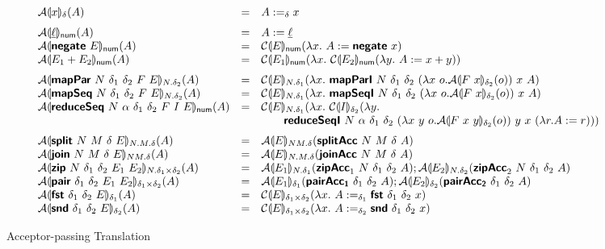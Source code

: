 \begin{figure}[H]
  \begin{displaymath}
    \begin{array}{lcl}
      \semA{x}_\delta(A)
      &=& A :=_\delta x
      \medskip\\

      \semA{\underline{\ell}}_{\num}(A)
      &=& A := \underline{\ell}
      \\
      \semA{\prim{negate}~E}_{\num}(A)
      &=& \semE{E}_{\num}(\lambda x.~A := \prim{negate}~x)
      \\
      \semA{E_1 + E_2}_{\num}(A)
      &=& \semE{E_1}_{\num}(\lambda x.~\semE{E_2}_{\num}(\lambda y.~A := x + y))
      \medskip\\

      \semA{\prim{mapPar}~N~\delta_1~\delta_2~F~E}_{N.\delta_2}(A)
      &=& \semE{E}_{N.\delta_1}(\lambda x.~\prim{mapParI}~N~\delta_1~\delta_2~(\lambda x~o. \semA{F~x}_{\delta_2}(o))~x~A)
      \\
      \semA{\prim{mapSeq}~N~\delta_1~\delta_2~F~E}_{N.\delta_2}(A)
      &=& \semE{E}_{N.\delta_1}(\lambda x.~\prim{mapSeqI}~N~\delta_1~\delta_2~(\lambda x~o. \semA{F~x}_{\delta_2}(o))~x~A)
      \\
      \semA{\prim{reduceSeq}~N~\alpha~\delta_1~\delta_2~F~I~E}_{\mathsf{num}}(A)
      &=& \begin{array}[t]{@{}l}
            \semE{E}_{N.\delta_1}(\lambda x.~\semE{I}_{\delta_2}(\lambda y.\\
            \quad\quad \prim{reduceSeqI}~N~\alpha~\delta_1~\delta_2~(\lambda x~y~o. \semA{F~x~y}_{\delta_2}(o))~y~x~(\lambda r.A := r)))
          \end{array}
      \medskip\\

      \semA{\prim{split}~N~M~\delta~E}_{N.M.\delta}(A)
      &=& \semA{E}_{NM.\delta}(\prim{splitAcc}~N~M~\delta~A)
      \\
      \semA{\prim{join}~N~M~\delta~E}_{NM.\delta}(A)
      &=& \semA{E}_{N.M.\delta}(\prim{joinAcc}~N~M~\delta~A)
      \\
      \semA{\prim{zip}~N~\delta_1~\delta_2~E_1~E_2}_{N.\delta_1\times\delta_2}(A)
      &=& \semA{E_1}_{N.\delta_1}(\prim{zipAcc}_1~N~\delta_1~\delta_2~A);
          \semA{E_2}_{N.\delta_2}(\prim{zipAcc}_2~N~\delta_1~\delta_2~A)
      \\
      \semA{\prim{pair}~\delta_1~\delta_2~E_1~E_2}_{\delta_1\times\delta_2}(A)
      &=& \semA{E_1}_{\delta_1}(\prim{pairAcc_1}~\delta_1~\delta_2~A);
          \semA{E_2}_{\delta_2}(\prim{pairAcc_2}~\delta_1~\delta_2~A)
      \\
      \semA{\prim{fst}~{\delta_1}~{\delta_2}~E}_{\delta_1}(A)
      &=& \semE{E}_{\delta_1\times\delta_2}(\lambda x.~A :=_{\delta_1} \prim{fst}~{\delta_1}~{\delta_2}~x)
      \\
      \semA{\prim{snd}~{\delta_1}~{\delta_2}~E}_{\delta_2}(A)
      &=& \semE{E}_{\delta_1\times\delta_2}(\lambda x.~A :=_{\delta_2} \prim{snd}~{\delta_1}~{\delta_2}~x)
    \end{array}
  \end{displaymath}
  \caption{Acceptor-passing Translation}\label{fig:acc-trans}
\end{figure}

